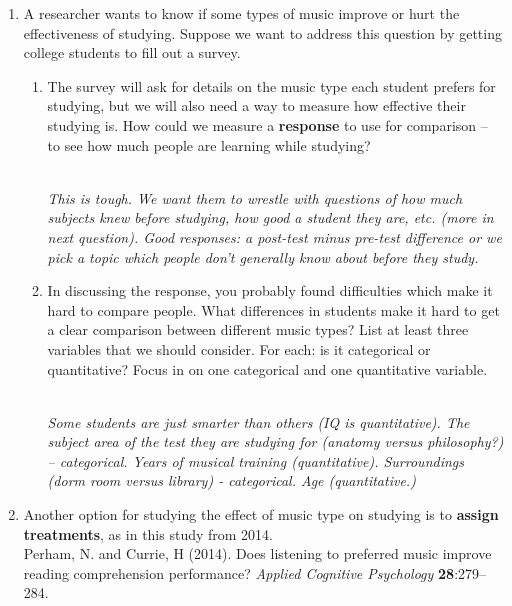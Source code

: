 \begin{enumerate}
\item A researcher wants to know if some types of music  improve or
  hurt the effectiveness of studying.  Suppose we want to address
  this question by getting college students to fill out a survey.
  \begin{enumerate}
  \item \label{response1} The survey will ask for details on the music
    type each student
    prefers for studying, but we will also need a way to measure how
    effective their studying is.  How could we measure a {\bf
      response} to use for comparison --  to see how much people are
    learning while studying?
\begin{students}
        \vspace{3cm}
\end{students}
\begin{key}
  \\ {\it This is tough. We want them to wrestle with questions of how
  much subjects knew before studying, how good a student they are, etc.
  (more in next question).  Good responses:  a post-test
  minus pre-test difference or we pick a topic which
  people don't generally know about before they study.}
\end{key}
     \item\label{lurking} In discussing the response, you probably
       found difficulties which make it hard to compare people.  What
       differences in students 
       make it hard to get a clear comparison between different music
       types?  List at least three variables that we should consider.
       For each: is it categorical or quantitative?  Focus in on
       one categorical and one quantitative variable.
\begin{students}
        \vspace{5cm}
\end{students}
\begin{key}
  \\ {\it Some students are just smarter than others (IQ is
    quantitative). The subject area of the test they are studying for (anatomy
    versus philosophy?) -- categorical. Years of musical training
    (quantitative). Surroundings (dorm room versus library) -
    categorical. Age (quantitative.) }
\end{key}
  \end{enumerate}
\item Another option for studying the effect of music type on studying is
  to {\bf assign treatments}, as in this study from 2014.  \\
   Perham, N. and Currie, H (2014). Does listening to preferred music
   improve reading comprehension performance? {\em Applied Cognitive
     Psychology} {\bf 28}:279--284.


\end{enumerate}
